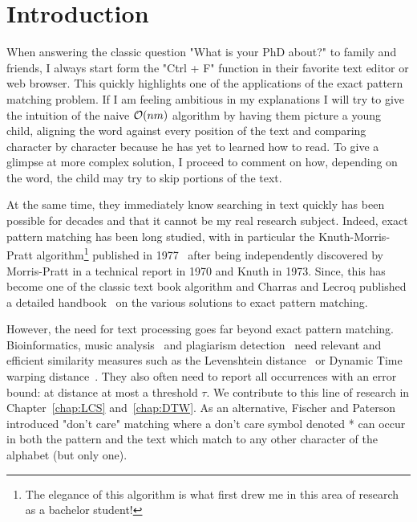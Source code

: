 \chapter*{Introduction}\label{chap:intro}

When answering the classic question "What is your PhD about?" to family and friends, I always start form the "Ctrl + F" function in their favorite text editor or web browser. This quickly highlights one of the applications of the exact pattern matching problem. If I am feeling ambitious in my explanations I will try to give the intuition of the naive $\mathcal{O}(nm)$ algorithm by having them picture a young child, aligning the word against every position of the text and comparing character by character because he has yet to learned how to read. To give a glimpse at more complex solution, I proceed to comment on how, depending on the word, the child may try to skip portions of the text.

At the same time, they immediately know searching in text quickly has been possible for decades and that it cannot be my real research subject. Indeed, exact pattern matching has been long studied, with in particular the Knuth-Morris-Pratt algorithm\footnote{The elegance of this algorithm is what first drew me in this area of research as a bachelor student!} published in 1977~\cite{KMP} after being independently discovered by Morris-Pratt in a technical report in 1970 and Knuth in 1973. Since, this has become one of the classic text book algorithm and Charras and Lecroq published a detailed handbook~\cite{charras2004handbook} on the various solutions to exact pattern matching.

However, the need for text processing goes far beyond exact pattern matching.
Bioinformatics\cite{Gusfield1997}, music analysis~\cite{mongeau1990comparison} and plagiarism detection~\cite{lukashenko2007computer} need relevant and efficient similarity measures such as the Levenshtein distance~\cite{levenshtein1966binary} or Dynamic Time warping distance~\cite{sakoe1978dynamic}. They also often need to report all occurrences with an error bound\cite{landau1986efficient,landau1989fast}: at distance at most a threshold $\tau$.
We contribute to this line of research in Chapter~\ref{chap:LCS} and~\ref{chap:DTW}.
As an alternative, Fischer and Paterson~\cite{fischer1974string} introduced "don't care" matching where a don't care symbol denoted * can occur in both the pattern and the text which match to any other character of the alphabet (but only one).


